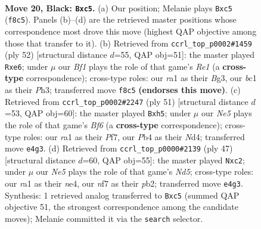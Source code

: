 \documentclass[11pt]{article}
\begin{document}
\clearpage

\begin{figure}[p]\centering
\begin{subfigure}{0.46\textwidth}\centering
\resizebox{\linewidth}{!}{%
\newchessgame
\chessboard[
  setfen={r1b2b2/2k2N1p/2p1p1p1/2P5/Pp2nP1P/4P3/8/RNB3K1 b - - 2 20},
  showmover=false,
  pgfstyle=straightmove, color=movearrow, markmove={f8-c5}
]}
\caption{}
\end{subfigure}\hfill
\begin{subfigure}{0.46\textwidth}\centering
\resizebox{\linewidth}{!}{%
\newchessgame
\chessboard[
  setfen={2r3k1/3n2p1/4p2p/3n1p2/p2N1P2/6BP/PP4P1/4R1K1 w - - 0 27},
  showmover=false,
  pgfstyle=straightmove, color=movearrow, markmove={e1-e6}
]}
\caption{}
\end{subfigure}
\\[4pt]
\begin{subfigure}{0.46\textwidth}\centering
\resizebox{\linewidth}{!}{%
\newchessgame
\chessboard[
  setfen={2r3k1/5ppp/1p2p3/7P/2Pn4/P1N2b2/1P3P1P/1K3BR1 b - - 10 26},
  showmover=false,
  pgfstyle=straightmove, color=movearrow, markmove={f3-h5}
]}
\caption{}
\end{subfigure}\hfill
\begin{subfigure}{0.46\textwidth}\centering
\resizebox{\linewidth}{!}{%
\newchessgame
\chessboard[
  setfen={6r1/1p2k3/p1p1b3/7p/P2nN3/6PP/1PP3B1/R5K1 b - - 1 24},
  showmover=false,
  pgfstyle=straightmove, color=movearrow, markmove={d4-c2}
]}
\caption{}
\end{subfigure}
\caption{\textbf{Move 20, Black: \texttt{Bxc5}.} (a) Our position; Melanie plays \texttt{Bxc5} (\texttt{f8c5}). Panels (b)--(d) are the retrieved master positions whose correspondence most drove this move (highest QAP objective among those that transfer to it). (b) Retrieved from \texttt{ccrl\_top\_p0002\#1459} (ply 52) [structural distance $d$=55, QAP obj=51]: the master played \texttt{Rxe6}; under $\mu$ our \emph{Bf1} plays the role of that game's \emph{Re1} (a \textbf{cross-type} correspondence); cross-type roles: our \emph{r}a1 as their \emph{B}g3, our \emph{b}c1 as their \emph{P}h3; transferred move \texttt{f8c5} \textbf{(endorses this move)}. (c) Retrieved from \texttt{ccrl\_top\_p0002\#2247} (ply 51) [structural distance $d$=53, QAP obj=60]: the master played \texttt{Bxh5}; under $\mu$ our \emph{Ne5} plays the role of that game's \emph{Bf6} (a \textbf{cross-type} correspondence); cross-type roles: our \emph{r}a1 as their \emph{P}f7, our \emph{P}b4 as their \emph{N}d4; transferred move \texttt{e4g3}. (d) Retrieved from \texttt{ccrl\_top\_p0000\#2139} (ply 47) [structural distance $d$=60, QAP obj=55]: the master played \texttt{Nxc2}; under $\mu$ our \emph{Ne5} plays the role of that game's \emph{Nd5}; cross-type roles: our \emph{r}a1 as their \emph{n}e4, our \emph{n}f7 as their \emph{p}b2; transferred move \texttt{e4g3}. Synthesis: 1 retrieved analog transferred to \texttt{Bxc5} (summed QAP objective 51, the strongest correspondence among the candidate moves); Melanie committed it via the \texttt{search} selector.}
\label{fig:thought-m39}
\end{figure}
\end{document}
